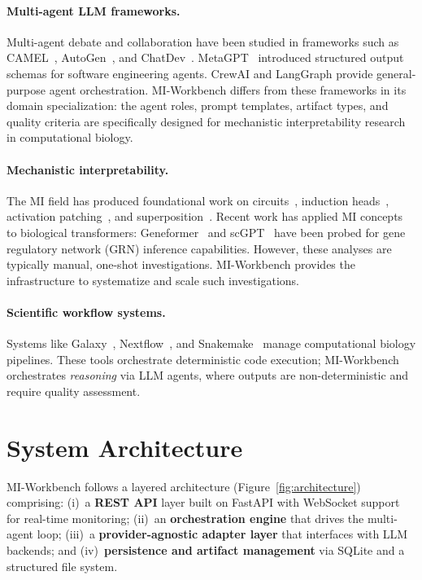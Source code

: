 \documentclass[10pt]{article}
\begin{document}
\paragraph{Multi-agent LLM frameworks.}
Multi-agent debate and collaboration have been studied in frameworks such as CAMEL~\citep{li2023camel}, AutoGen~\citep{wu2023autogen}, and ChatDev~\citep{qian2024chatdev}. MetaGPT~\citep{hong2023metagpt} introduced structured output schemas for software engineering agents. CrewAI and LangGraph provide general-purpose agent orchestration. MI-Workbench differs from these frameworks in its domain specialization: the agent roles, prompt templates, artifact types, and quality criteria are specifically designed for mechanistic interpretability research in computational biology.

\paragraph{Mechanistic interpretability.}
The MI field has produced foundational work on circuits~\citep{olah2020zoom}, induction heads~\citep{olsson2022context}, activation patching~\citep{meng2022locating}, and superposition~\citep{elhage2022toy}. Recent work has applied MI concepts to biological transformers: Geneformer~\citep{theodoris2023transfer} and scGPT~\citep{cui2024scgpt} have been probed for gene regulatory network (GRN) inference capabilities. However, these analyses are typically manual, one-shot investigations. MI-Workbench provides the infrastructure to systematize and scale such investigations.

\paragraph{Scientific workflow systems.}
Systems like Galaxy~\citep{afgan2018galaxy}, Nextflow~\citep{ditommaso2017nextflow}, and Snakemake~\citep{molder2021sustainable} manage computational biology pipelines. These tools orchestrate deterministic code execution; MI-Workbench orchestrates \emph{reasoning} via LLM agents, where outputs are non-deterministic and require quality assessment.


\section{System Architecture}
\label{sec:architecture}

MI-Workbench follows a layered architecture (Figure~\ref{fig:architecture}) comprising: (i)~a \textbf{REST API} layer built on FastAPI with WebSocket support for real-time monitoring; (ii)~an \textbf{orchestration engine} that drives the multi-agent loop; (iii)~a \textbf{provider-agnostic adapter layer} that interfaces with LLM backends; and (iv)~\textbf{persistence and artifact management} via SQLite and a structured file system.
\end{document}
